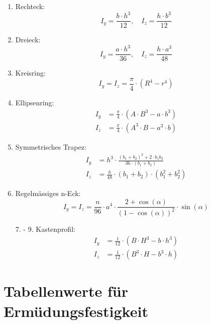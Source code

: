 \begin{multicols}{3}
			\begin{enumerate}
				\item Rechteck:
					\begin{equation*}
						I_y = \frac{b\cdot h^3}{12}, \quad I_z = \frac{h\cdot b^3}{12}
					\end{equation*}
				\item Dreieck:
					\begin{equation*}
						I_y = \frac{a \cdot h^3}{36}, \quad I_z = \frac{h \cdot a^3}{48}
					\end{equation*}
				\item Kreisring:
					\begin{equation*}
						I_y = I_z = \frac{\pi}{4}\cdot (R^4 - r^4)
					\end{equation*}
				\item Ellipsenring:
					\begin{align*}
						I_y &= \frac{\pi}{4}\cdot (A\cdot B^3 - a \cdot b^3) \\
						I_z &= \frac{\pi}{4}\cdot (A^3\cdot B - a^3 \cdot b)
					\end{align*}
				\item Symmetrisches Trapez:
					\begin{align*}
						I_y &= h^3 \cdot \frac{(b_1 + b_2)^2 + 2 \cdot b_1b_2}{36 \cdot (b_1 + b_2)} \\
						I_z &= \frac{h}{48}\cdot (b_1 + b_2) \cdot (b_1^2 + b_2^2)
					\end{align*}
				\item Regelmässiges n-Eck:
					\begin{equation*}
						I_y = I_z = \frac{n}{96}\cdot a^4 \cdot \frac{2 + \cos(\alpha)}{(1-\cos(\alpha))^2}\cdot \sin(\alpha)
					\end{equation*}
				\item[7. - 9.] Kastenprofil:
					\begin{align*}
						I_y &= \frac{1}{12}\cdot (B\cdot H^3 - b \cdot h^3) \\
						I_z &= \frac{1}{12}\cdot (B^3\cdot H - b^3 \cdot h)
					\end{align*}
			\end{enumerate}
\chapter{Tabellenwerte für Ermüdungsfestigkeit} %

\end{multicols}
